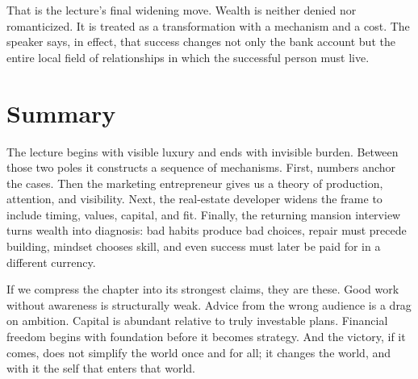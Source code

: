 That is the lecture's final widening move. Wealth is neither denied nor romanticized. It is treated as a transformation with a mechanism and a cost. The speaker says, in effect, that success changes not only the bank account but the entire local field of relationships in which the successful person must live.

\section{Summary}

The lecture begins with visible luxury and ends with invisible burden. Between those two poles it constructs a sequence of mechanisms. First, numbers anchor the cases. Then the marketing entrepreneur gives us a theory of production, attention, and visibility. Next, the real-estate developer widens the frame to include timing, values, capital, and fit. Finally, the returning mansion interview turns wealth into diagnosis: bad habits produce bad choices, repair must precede building, mindset chooses skill, and even success must later be paid for in a different currency.

If we compress the chapter into its strongest claims, they are these. Good work without awareness is structurally weak. Advice from the wrong audience is a drag on ambition. Capital is abundant relative to truly investable plans. Financial freedom begins with foundation before it becomes strategy. And the victory, if it comes, does not simplify the world once and for all; it changes the world, and with it the self that enters that world.
